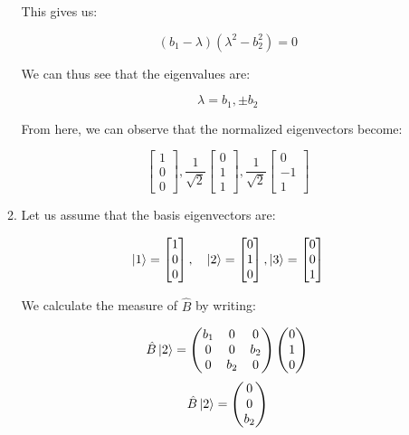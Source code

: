 \begin{enumerate}
\begin{enumerate}
        This gives us:

        $$(b_1-\lambda)(\lambda^2-b_2^2)=0$$

        We can thus see that the eigenvalues are:

        $$\boxed{\lambda=b_1,\pm b_2}$$

        From here, we can observe that the normalized eigenvectors become:

        $$\boxed{\left[ \begin{matrix} 1 \\ 0 \\ 0 \end{matrix}\right],\frac{1}{\sqrt{2}}\left[ \begin{matrix} 0\\1\\1\end{matrix} \right],\frac{1}{\sqrt{2}}\left[ \begin{matrix}0\\-1\\1\end{matrix} \right]}$$

      \item Let us assume that the basis eigenvectors are:

        $$\ket{1}= \left[ \begin{matrix} 1\\0\\0\end{matrix} \right],\quad\ket{2}=\left[ \begin{matrix}0\\1\\0\end{matrix} \right],\ket{3}=\left[ \begin{matrix} 0\\0\\1\end{matrix} \right]$$

        We calculate the measure of $\hat{B}$ by writing:

        $$\hat{B}\ket{2}=\left( \begin{matrix} b_1 & 0 & 0\\ 0 & 0 & b_2\\ 0 & b_2 & 0\end{matrix} \right)\left( \begin{matrix}0\\1\\0\end{matrix} \right)$$
        $$\hat{B}\ket{2}=\left( \begin{matrix}0\\0\\b_2\end{matrix} \right)$$


\end{enumerate}
\end{enumerate}
